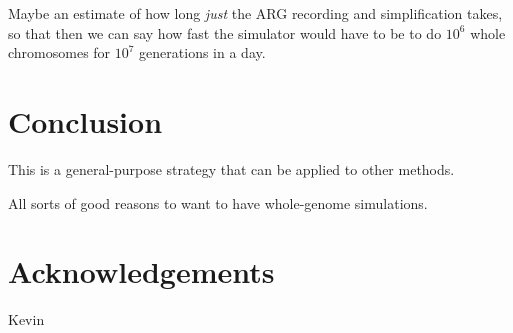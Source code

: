 \documentclass{article}
\begin{document}
Maybe an estimate of how long \emph{just} the ARG recording and simplification takes,
so that then we can say how fast the simulator would have to be to do $10^6$ whole chromosomes for $10^7$ generations
in a day.

\section*{Conclusion}

This is a general-purpose strategy that can be applied to other methods.

All sorts of good reasons to want to have whole-genome simulations.

\section*{Acknowledgements}

Kevin 

  
\end{document}
